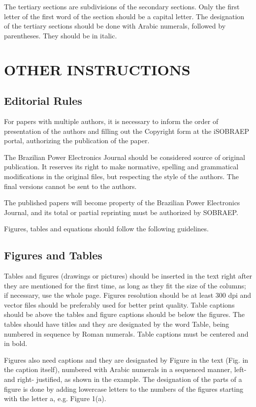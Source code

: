 \documentclass[english]{cobep-spec}
\begin{document}
The tertiary sections are subdivisions of the secondary sections. Only the first letter of the first word of the section should be a capital letter. The designation of the tertiary sections should be done with Arabic numerals, followed by parentheses. They should be in italic.

\section{OTHER INSTRUCTIONS}

\subsection{Editorial Rules}

For papers with multiple authors, it is necessary to inform the order of presentation of the authors and filling out the Copyright form at the iSOBRAEP portal, authorizing the publication of the paper.

The Brazilian Power Electronics Journal should be considered source of original publication. It reserves its right to make normative, spelling and grammatical modifications in the original files, but respecting the style of the authors. The final versions cannot be sent to the authors.

The published papers will become property of the Brazilian Power Electronics Journal, and its total or partial reprinting must be authorized by SOBRAEP.

Figures, tables and equations should follow the following guidelines.

\subsection{Figures and Tables}

Tables and figures (drawings or pictures) should be inserted in the text right after they are mentioned for the first time, as long as they fit the size of the columns; if necessary, use the whole page. Figures resolution should be at least 300 dpi and vector files should be preferably used for better print quality. Table captions should be above the tables and figure captions should be below the figures. The tables should have titles and they are designated by the word Table, being numbered in sequence by Roman numerals. Table captions must be centered and in bold.

Figures also need captions and they are designated by Figure in the text (Fig. in the caption itself), numbered with Arabic numerals in a sequenced manner, left- and right- justified, as shown in the example. The designation of the parts of a figure is done by adding lowercase letters to the numbers of the figures starting with the letter a, e.g. Figure 1(a).
\end{document}
